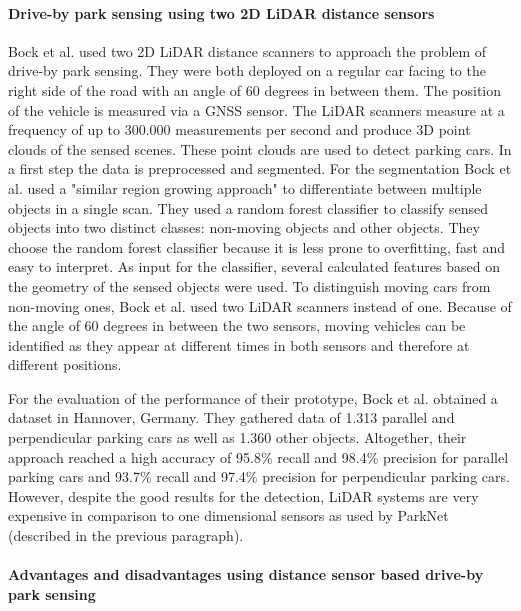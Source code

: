 \paragraph{Drive-by park sensing using two 2D LiDAR distance sensors}

Bock et al. \cite{Bock2015} used two 2D LiDAR distance scanners to approach the problem of drive-by park sensing. They were both deployed on a regular car facing to the right side of the road with an angle of 60 degrees in between them. The position of the vehicle is measured via a GNSS sensor.
The LiDAR scanners measure at a frequency of up to 300.000 measurements per second and produce 3D point clouds of the sensed scenes. These point clouds are used to detect parking cars. In a first step the data is preprocessed and segmented. For the segmentation Bock et al. used a "similar region growing approach" to differentiate between multiple objects in a single scan. They used a random forest classifier to classify sensed objects into two distinct classes: non-moving objects and other objects. They choose the random forest classifier because it is less prone to overfitting, fast and easy to interpret. As input for the classifier, several calculated features based on the geometry of the sensed objects were used. To distinguish moving cars from non-moving ones, Bock et al. used two LiDAR scanners instead of one. Because of the angle of 60 degrees in between the two sensors, moving vehicles can be identified as they appear at different times in both sensors and therefore at different positions.

For the evaluation of the performance of their prototype, Bock et al. obtained a dataset in Hannover, Germany. They gathered data of 1.313 parallel and perpendicular parking cars as well as 1.360 other objects. Altogether, their approach reached a high accuracy of 95.8\% recall and 98.4\% precision for parallel parking cars and 93.7\% recall and 97.4\% precision for perpendicular parking cars. However, despite the good results for the detection, LiDAR systems are very expensive in comparison to one dimensional sensors as used by ParkNet (described in the previous paragraph).


\paragraph{Advantages and disadvantages using distance sensor based drive-by park sensing}

